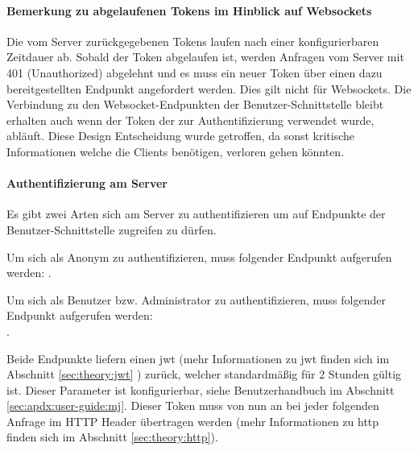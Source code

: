 \paragraph{Bemerkung zu abgelaufenen Tokens im Hinblick auf Websockets}
Die vom Server zurückgegebenen Tokens laufen nach einer konfigurierbaren Zeitdauer ab. Sobald der Token abgelaufen ist, werden Anfragen vom Server mit 401 (Unauthorized) abgelehnt und es muss ein neuer Token über einen dazu bereitgestellten Endpunkt angefordert werden. Dies gilt nicht für Websockets. Die Verbindung zu den Websocket-Endpunkten der Benutzer-Schnittstelle bleibt erhalten auch wenn der Token der zur Authentifizierung verwendet wurde, abläuft. Diese Design Entscheidung wurde getroffen, da sonst kritische Informationen welche die Clients benötigen, verloren gehen könnten.  

\paragraph{Authentifizierung am Server}
Es gibt zwei Arten sich am Server zu authentifizieren um auf Endpunkte der Benutzer-Schnittstelle zugreifen zu dürfen.
\begin{description}\setlength\itemsep{0.8em}
\item[Authentifizierung als Anonym] Um sich als Anonym zu authentifizieren, muss folgender Endpunkt aufgerufen werden: . 
\item[Authentifizierung als Benutzer bzw. Administrator] Um sich als Benutzer bzw. Administrator zu authentifizieren, muss folgender Endpunkt aufgerufen werden:\\ .
\end{description}
Beide Endpunkte liefern einen \acrshort{jwt} (mehr Informationen zu \acrlong{jwt} finden sich im Abschnitt \ref{sec:theory:jwt} ) zurück, welcher standardmäßig für 2 Stunden gültig ist. Dieser Parameter ist konfigurierbar, siehe Benutzerhandbuch im Abschnitt \ref{sec:apdx:user-guide:mj}. Dieser Token muss von nun an bei jeder folgenden Anfrage im HTTP  Header übertragen werden (mehr Informationen zu \acrshort{http} finden sich im Abschnitt \ref{sec:theory:http}). 

